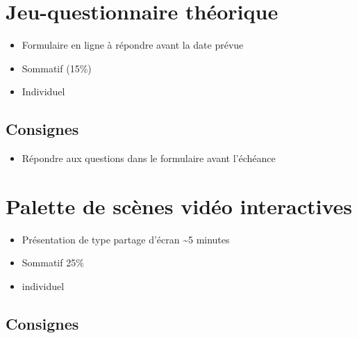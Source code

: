 \documentclass[
]{book}
\providecommand{\tightlist}{%
  \setlength{\itemsep}{0pt}\setlength{\parskip}{0pt}}
\begin{document}
\hypertarget{sommatif_3}{%
\section{Jeu-questionnaire théorique}\label{sommatif_3}}

\begin{itemize}
\tightlist
\item
  Formulaire en ligne à répondre avant la date prévue
\item
  Sommatif (15\%)
\item
  Individuel
\end{itemize}

\hypertarget{consignes-2}{%
\subsection{Consignes}\label{consignes-2}}

\begin{itemize}
\tightlist
\item
  Répondre aux questions dans le formulaire avant l'échéance
\end{itemize}

\hypertarget{sommatif_4}{%
\section{Palette de scènes vidéo interactives}\label{sommatif_4}}

\begin{itemize}
\tightlist
\item
  Présentation de type partage d'écran \textasciitilde5 minutes
\item
  Sommatif 25\%
\item
  individuel
\end{itemize}

\hypertarget{consignes-3}{%
\subsection{Consignes}\label{consignes-3}}
\end{document}
